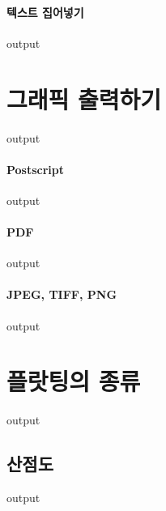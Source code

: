 \documentclass{report}
\begin{document}
\paragraph{텍스트 집어넣기}
\begin{Schunk}
\begin{Soutput}
output
\end{Soutput}
\end{Schunk}

\section{그래픽 출력하기}
\begin{Schunk}
\begin{Soutput}
output
\end{Soutput}
\end{Schunk}
\paragraph{Postscript}
\begin{Schunk}
\begin{Soutput}
output
\end{Soutput}
\end{Schunk}
\paragraph{PDF}
\begin{Schunk}
\begin{Soutput}
output
\end{Soutput}
\end{Schunk}
\paragraph{JPEG, TIFF, PNG}
\begin{Schunk}
\begin{Soutput}
output
\end{Soutput}
\end{Schunk}

\section{플랏팅의 종류}
\begin{Schunk}
\begin{Soutput}
output
\end{Soutput}
\end{Schunk}

\subsection{산점도}
\begin{Schunk}
\begin{Soutput}
output
\end{Soutput}
\end{Schunk}
\end{document}
